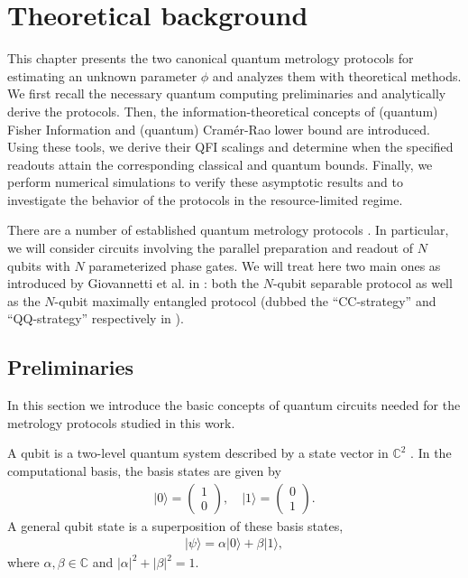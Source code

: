 \cleardoubleoddpage%
\chapter{Theoretical background}
\label{sec:theory}
This chapter presents the two canonical quantum metrology protocols for estimating an unknown parameter $\phi$ and analyzes them with theoretical methods.
We first recall the necessary quantum computing preliminaries and analytically derive the protocols.
Then, the information-theoretical concepts of (quantum) Fisher Information and (quantum) Cramér-Rao lower bound are introduced.
Using these tools, we derive their QFI scalings and determine when the specified readouts attain the corresponding classical and quantum bounds.
Finally, we perform numerical simulations to verify these asymptotic results and to investigate
the behavior of the protocols in the resource-limited regime.

There are a number of established quantum metrology protocols \cite{giovannettiQuantumMetrology2006,giovannettiAdvancesQuantumMetrology2011, tothQuantumMetrologyQuantum2014}.
In particular, we will consider circuits involving the parallel preparation and readout of $N$ qubits with $N$ parameterized phase gates.
We will treat here two main ones as introduced by Giovannetti et al. in \cite{giovannettiQuantumMetrology2006}: 
both the $N$-qubit separable protocol as well as the $N$-qubit maximally entangled protocol 
(dubbed the ``CC-strategy'' and ``QQ-strategy'' respectively in \cite{giovannettiQuantumMetrology2006}).

\section{Preliminaries}
\label{sec:theory:preliminaries}
In this section we introduce the basic concepts of quantum circuits needed for the metrology protocols studied in this work.

A qubit is a two-level quantum system described by a state vector in $\mathbb{C}^2$ \cite{kuengQuantumcomputing, nielsenQuantumComputationQuantum2012}. In the computational basis, the basis states are given by
\begin{align}
    \lvert 0 \rangle = \begin{pmatrix} 1 \\ 0 \end{pmatrix}, \quad
    \lvert 1 \rangle = \begin{pmatrix} 0 \\ 1 \end{pmatrix}.
\end{align}
A general qubit state is a superposition of these basis states,
\begin{align}
    \lvert \psi \rangle = \alpha \lvert 0 \rangle + \beta \lvert 1 \rangle,
\end{align}
where $\alpha, \beta \in \mathbb{C}$ and $|\alpha|^2 + |\beta|^2 = 1$.

